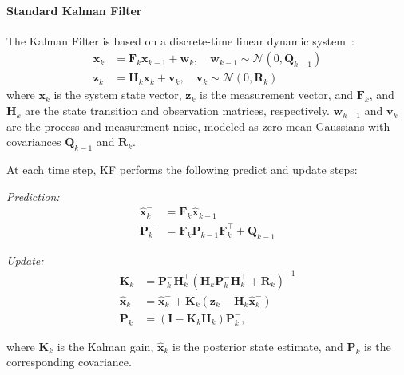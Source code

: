 \paragraph{Standard Kalman Filter}

The Kalman Filter is based on a discrete-time linear dynamic system~\cite{wiley_kalman}:
\begin{align}
    \mathbf{x}_k &= \mathbf{F}_{k} \mathbf{x}_{k-1} + \mathbf{w}_{k}, \quad \mathbf{w}_{k-1} \sim \mathcal{N}(0, \mathbf{Q}_{k-1}) \\
    \mathbf{z}_k &= \mathbf{H}_k \mathbf{x}_k + \mathbf{v}_k, \quad \mathbf{v}_k \sim \mathcal{N}(0, \mathbf{R}_k)
\end{align}
where $\mathbf{x}_k$ is the system state vector, $\mathbf{z}_k$ is the measurement vector,  and $\mathbf{F}_k$, and $\mathbf{H}_k$ are the state transition and observation matrices, respectively. $\mathbf{w}_{k-1}$ and $\mathbf{v}_k$ are the process and measurement noise, modeled as zero-mean Gaussians with covariances $\mathbf{Q}_{k-1}$ and $\mathbf{R}_k$.

At each time step, KF performs the following predict and update steps:

\emph{Prediction:}
\begin{align}
    \hat{\mathbf{x}}_k^- &= \mathbf{F}_k \hat{\mathbf{x}}_{k-1} \\
    \mathbf{P}_k^- &= \mathbf{F}_k \mathbf{P}_{k-1} \mathbf{F}_k^\top + \mathbf{Q}_{k-1}
\end{align}

\emph{Update:}
\begin{align}
    \mathbf{K}_k &= \mathbf{P}_k^- \mathbf{H}_k^\top \left( \mathbf{H}_k \mathbf{P}_k^- \mathbf{H}_k^\top + \mathbf{R}_k \right)^{-1} \\
    \hat{\mathbf{x}}_k &= \hat{\mathbf{x}}_k^- + \mathbf{K}_k (\mathbf{z}_k - \mathbf{H}_k \hat{\mathbf{x}}_k^-) \\
    \mathbf{P}_k &= (\mathbf{I} - \mathbf{K}_k \mathbf{H}_k) \mathbf{P}_k^-,
\end{align}

where $\mathbf{K}_k$ is the Kalman gain, $\hat{\mathbf{x}}_k$ is the posterior state estimate, and $\mathbf{P}_k$ is the corresponding covariance.

